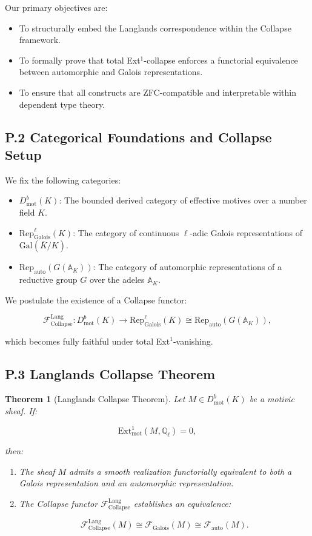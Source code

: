\documentclass[11pt]{article}
\newtheorem{theorem}{Theorem}[section]
\begin{document}
Our primary objectives are:
\begin{itemize}
  \item To structurally embed the Langlands correspondence within the Collapse framework.
  \item To formally prove that total Ext$^1$-collapse enforces a functorial equivalence between automorphic and Galois representations.
  \item To ensure that all constructs are ZFC-compatible and interpretable within dependent type theory.
\end{itemize}

\subsection*{P.2 Categorical Foundations and Collapse Setup}

We fix the following categories:
\begin{itemize}
  \item $D^b_{\mathrm{mot}}(K)$: The bounded derived category of effective motives over a number field $K$.
  \item $\mathrm{Rep}^\ell_{\mathrm{Galois}}(K)$: The category of continuous $\ell$-adic Galois representations of $\mathrm{Gal}(\overline{K}/K)$.
  \item $\mathrm{Rep}_{\mathrm{auto}}(G(\mathbb{A}_K))$: The category of automorphic representations of a reductive group $G$ over the adeles $\mathbb{A}_K$.
\end{itemize}

We postulate the existence of a Collapse functor:

\[
\mathcal{F}_{\mathrm{Collapse}}^{\mathrm{Lang}} : D^b_{\mathrm{mot}}(K) \longrightarrow \mathrm{Rep}^\ell_{\mathrm{Galois}}(K) \cong \mathrm{Rep}_{\mathrm{auto}}(G(\mathbb{A}_K)),
\]

which becomes fully faithful under total Ext$^1$-vanishing.

\subsection*{P.3 Langlands Collapse Theorem}

\begin{theorem}[Langlands Collapse Theorem]
Let $M \in D^b_{\mathrm{mot}}(K)$ be a motivic sheaf. If:

\[
\mathrm{Ext}^1_{\mathrm{mot}}(M, \mathbb{Q}_\ell) = 0,
\]

then:
\begin{enumerate}
  \item The sheaf $M$ admits a smooth realization functorially equivalent to both a Galois representation and an automorphic representation.
  \item The Collapse functor $\mathcal{F}_{\mathrm{Collapse}}^{\mathrm{Lang}}$ establishes an equivalence:

  \[
  \mathcal{F}_{\mathrm{Collapse}}^{\mathrm{Lang}}(M) \cong \mathcal{F}_{\mathrm{Galois}}(M) \cong \mathcal{F}_{\mathrm{auto}}(M).
  \]
\end{enumerate}

\end{theorem}
\end{document}
